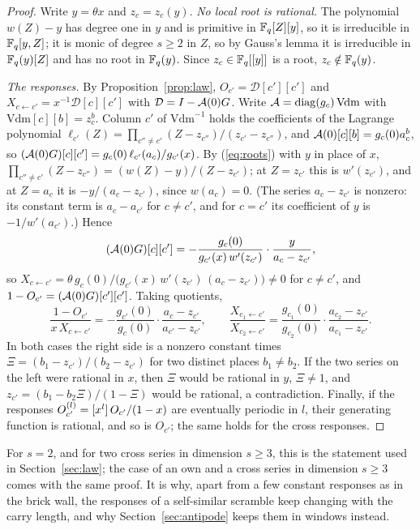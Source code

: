 \begin{proof}
Write $y=\theta x$ and $z_c=z_c(y)$. \emph{No local root is rational.} The polynomial $w(Z)-y$ has degree one in $y$ and is primitive in $\mathbb{F}_q[Z][y]$, so it is irreducible in $\mathbb{F}_q[y,Z]$; it is monic of degree $s\ge2$ in $Z$, so by Gauss's lemma it is irreducible in $\mathbb{F}_q(y)[Z]$ and has no root in $\mathbb{F}_q(y)$. Since $z_c\in\mathbb{F}_q[[y]]$ is a root, $z_c\notin\mathbb{F}_q(y)$.

\emph{The responses.} By Proposition~\ref{prop:law}, $O_{c'}=\mathcal D[c'][c']$ and $X_{c\leftarrow c'}=x^{-1}\mathcal D[c][c']$ with $\mathcal D=I-\mathcal{A}(0)G$. Write $\mathcal{A}=\operatorname{diag}(g_c)\,\mathrm{Vdm}$ with $\mathrm{Vdm}[c][b]=z_c^b$. Column $c'$ of $\mathrm{Vdm}^{-1}$ holds the coefficients of the Lagrange polynomial $\ell_{c'}(Z)=\prod_{c''\ne c'}(Z-z_{c''})/(z_{c'}-z_{c''})$, and $\mathcal{A}(0)[c][b]=g_c(0)a_c^b$, so $(\mathcal{A}(0)G)[c][c']=g_c(0)\,\ell_{c'}(a_c)/g_{c'}(x)$. By (\ref{eq:roots}) with $y$ in place of $x$, $\prod_{c''\ne c'}(Z-z_{c''})=(w(Z)-y)/(Z-z_{c'})$; at $Z=z_{c'}$ this is $w'(z_{c'})$, and at $Z=a_c$ it is $-y/(a_c-z_{c'})$, since $w(a_c)=0$. (The series $a_c-z_{c'}$ is nonzero: its constant term is $a_c-a_{c'}$ for $c\ne c'$, and for $c=c'$ its coefficient of $y$ is $-1/w'(a_{c'})$.) Hence
\[
(\mathcal{A}(0)G)[c][c']=-\frac{g_c(0)}{g_{c'}(x)\,w'(z_{c'})}\cdot\frac{y}{a_c-z_{c'}},
\]
so $X_{c\leftarrow c'}=\theta\,g_c(0)/\bigl(g_{c'}(x)\,w'(z_{c'})\,(a_c-z_{c'})\bigr)\ne0$ for $c\ne c'$, and $1-O_{c'}=(\mathcal{A}(0)G)[c'][c']$. Taking quotients,
\[
\frac{1-O_{c'}}{x\,X_{c\leftarrow c'}}=-\frac{g_{c'}(0)}{g_c(0)}\cdot\frac{a_c-z_{c'}}{a_{c'}-z_{c'}},\qquad
\frac{X_{c_1\leftarrow c'}}{X_{c_2\leftarrow c'}}=\frac{g_{c_1}(0)}{g_{c_2}(0)}\cdot\frac{a_{c_2}-z_{c'}}{a_{c_1}-z_{c'}} .
\]
In both cases the right side is a nonzero constant times $\Xi=(b_1-z_{c'})/(b_2-z_{c'})$ for two distinct places $b_1\ne b_2$. If the two series on the left were rational in $x$, then $\Xi$ would be rational in $y$, $\Xi\ne1$, and $z_{c'}=(b_1-b_2\Xi)/(1-\Xi)$ would be rational, a contradiction. Finally, if the responses $O^{(l)}_{c'}=[x^{l}]\,O_{c'}/(1-x)$ are eventually periodic in $l$, their generating function is rational, and so is $O_{c'}$; the same holds for the cross responses.
\end{proof}

For $s=2$, and for two cross series in dimension $s\ge3$, this is the statement used in Section~\ref{sec:law}; the case of an own and a cross series in dimension $s\ge3$ comes with the same proof. It is why, apart from a few constant responses as in the brick wall, the responses of a self-similar scramble keep changing with the carry length, and why Section~\ref{sec:antipode} keeps them in windows instead.

